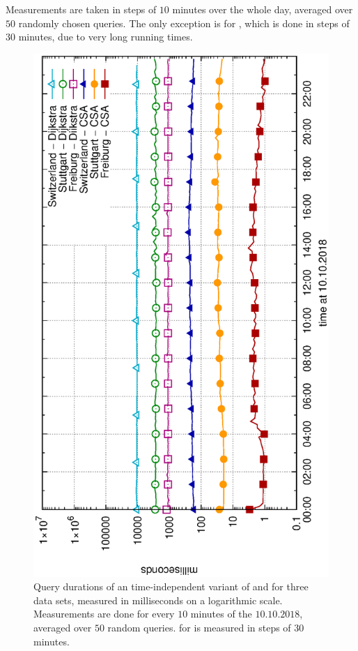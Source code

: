 	Measurements are taken in steps of $10$ minutes over the whole day, averaged over $50$ randomly chosen queries.
	The only exception is \dijkstra for \switzerlandR, which is done in steps of $30$ minutes, due to very long running times.\\
	\begin{figure}[!ht]
		 \begin{center}
			\includegraphics[scale=0.55,angle=-90]{res/plots/uniModalTimeDependentResultsAll}
		\end{center}
		\caption{Query durations of an time-independent variant of \dijkstra and \csa for three data sets, measured in milliseconds
			on a logarithmic scale. Measurements are done for every $10$ minutes of the $10.10.2018$, averaged over $50$ random queries.
			\dijkstra for \switzerlandR is measured in steps of $30$ minutes.}
		\label{uniModalTimeDependentResultsAll}
	\end{figure}
